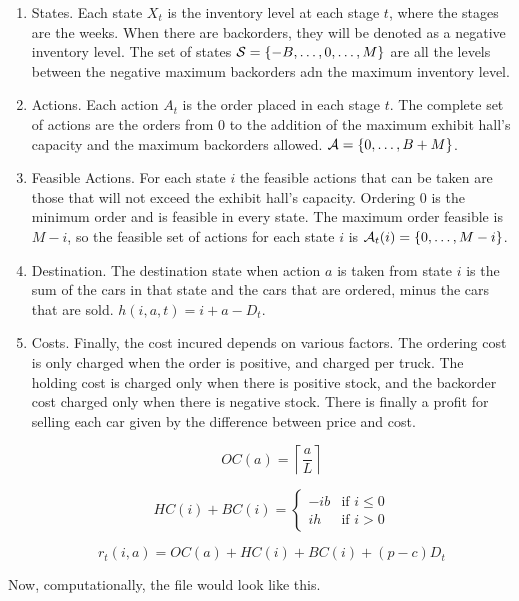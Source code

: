 \documentclass[11pt]{article}
\newcommand {\cA}{\ensuremath \mathcal{A}}
\newcommand {\cS}{\ensuremath \mathcal{S}}
\begin{document}
\begin{enumerate}
  \item States. Each state $X_t$ is the inventory level at each stage $t$, where the stages are the weeks. When there are backorders, they will be denoted as a negative inventory level. The set of states $\cS = \{-B, \ldots, 0, \ldots, M  \}$ are all the levels between the negative maximum backorders adn the maximum inventory level.
  \item Actions. Each action $A_t$ is the order placed in each stage $t$. The complete set of actions are the orders from 0 to the addition of the maximum exhibit hall's capacity and the maximum backorders allowed. $\cA = \{0,\ldots,B+M\}$.
  \item Feasible Actions. For each state $i$ the feasible actions that can be taken are those that will not exceed the exhibit hall's capacity. Ordering 0 is the minimum order and is feasible in every state. The maximum order feasible is $M-i$, so the feasible set of actions for each state $i$ is $\cA_t(i) =\{0,\ldots,M-i\}$.
  \item Destination. The destination state when action $a$ is taken from state $i$ is the sum of the cars in that state and the cars that are ordered, minus the cars that are sold. $h(i,a,t)=i+a-D_t$.
  \item Costs. Finally, the cost incured depends on various factors. The ordering cost is only charged when the order is positive, and charged per truck. The holding cost is charged only when there is positive stock, and the backorder cost charged only when there is negative stock. There is finally a profit for selling each car given by the difference between price and cost.

  \begin{equation*}
    OC(a)=      \left\lceil \frac{a}{L}\right\rceil  
  \end{equation*}

  \begin{equation*}HC(i)+BC(i)=\left\{
    \begin{array}{cc}
      -ib & \textrm{if $i \le 0$}\\
      ih & \textrm{if $i > 0$}
    \end{array} \right.
  \end{equation*}


  \[r_t(i,a)= OC(a) + HC(i) + BC(i) + (p-c)D_t\]
\end{enumerate}


Now, computationally, the file would look like this.
\end{document}
